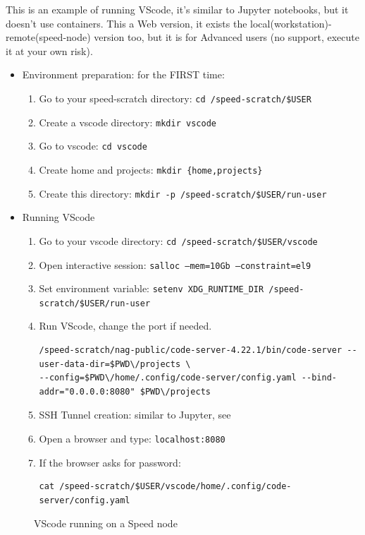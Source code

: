 This is an example of running VScode, it's similar to Jupyter notebooks, but it doesn't use containers.
This a Web version, it exists the local(workstation)-remote(speed-node) version too, but it is for Advanced users (no support, execute it at your own risk).

\begin{itemize}
\item
Environment preparation: for the FIRST time:
\begin{enumerate}
\item
Go to your speed-scratch directory: \texttt{cd /speed-scratch/\$USER}
\item
Create a vscode directory: \texttt{mkdir vscode}
\item
Go to vscode: \texttt{cd vscode}
\item
Create home and projects: \texttt{mkdir \{home,projects\}}
\item
Create this directory: \texttt {mkdir -p /speed-scratch/\$USER/run-user}
\end{enumerate}
\item
Running VScode
\begin{enumerate}
\item 
Go to your vscode directory: \texttt{cd /speed-scratch/\$USER/vscode}
\item
Open interactive session: \texttt {salloc --mem=10Gb --constraint=el9}
\item
Set environment variable: \texttt {setenv XDG\_RUNTIME\_DIR /speed-scratch/\$USER/run-user}
\item 
Run VScode, change the port if needed.
\scriptsize
\begin{verbatim}
/speed-scratch/nag-public/code-server-4.22.1/bin/code-server --user-data-dir=$PWD\/projects \
--config=$PWD\/home/.config/code-server/config.yaml --bind-addr="0.0.0.0:8080" $PWD\/projects
\end{verbatim}
\normalsize
\item
SSH Tunnel creation: similar to Jupyter, see 
\item
Open a browser and type: \texttt {localhost:8080}
\item
If the browser asks for password: 
\begin{verbatim}
cat /speed-scratch/$USER/vscode/home/.config/code-server/config.yaml
\end{verbatim}

\end{enumerate}
\end{itemize}

\begin{figure}[htbp]
	\centering
	\caption{VScode running on a Speed node}
	\label{fig:vscode}
\end{figure}